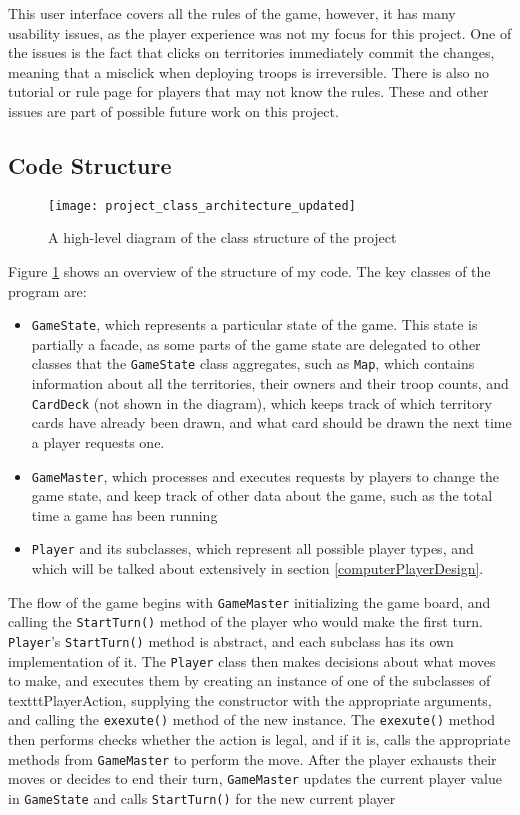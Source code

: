 This user interface covers all the rules of the game, however, it has many usability issues, as the player experience was not my focus for this project. One of the issues is the fact that clicks on territories immediately commit the changes, meaning that a misclick when deploying troops is irreversible. There is also no tutorial or rule page for players that may not know the rules. These and other issues are part of possible future work on this project.

\subsection{Code Structure}
\label{codeStructure}
\begin{figure}[H]
\texttt{[image: project\_class\_architecture\_updated]}
\caption{A high-level diagram of the class structure of the project}
\label{fig:UMLDiagram}
\end{figure}

Figure \ref{fig:UMLDiagram} shows an overview of the structure of my code. The key classes of the program are:
\begin{itemize}
\item \texttt{GameState}, which represents a particular state of the game. This state is partially a facade, as some parts of the game state are delegated to other classes that the \texttt{GameState} class aggregates, such as \texttt{Map}, which contains information about all the territories, their owners and their troop counts, and \texttt{CardDeck} (not shown in the diagram), which keeps track of which territory cards have already been drawn, and what card should be drawn the next time a player requests one.
\item \texttt{GameMaster}, which processes and executes requests by players to change the game state, and keep track of other data about the game, such as the total time a game has been running
\item \texttt{Player} and its subclasses, which represent all possible player types, and which will be talked about extensively in section \ref{computerPlayerDesign}.
\end{itemize}

The flow of the game begins with \texttt{GameMaster} initializing the game board, and calling the \texttt{StartTurn()} method of the player who would make the first turn. \texttt{Player}'s \texttt{StartTurn()} method is abstract, and each subclass has its own implementation of it. The \texttt{Player} class then makes decisions about what moves to make, and executes them by creating an instance of one of the subclasses of \\texttt{PlayerAction}, supplying the constructor with the appropriate arguments, and calling the \texttt{exexute()} method of the new instance. The \texttt{exexute()} method then performs checks whether the action is legal, and if it is, calls the appropriate methods from \texttt{GameMaster} to perform the move. After the player exhausts their moves or decides to end their turn, \texttt{GameMaster} updates the current player value in \texttt{GameState} and calls \texttt{StartTurn()} for the new current player


